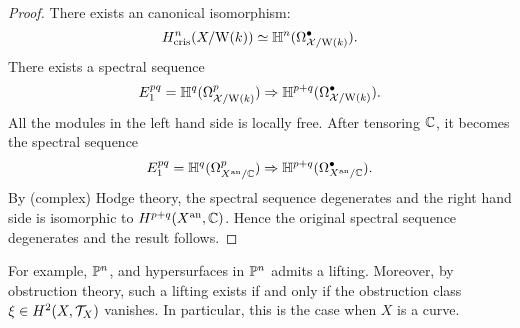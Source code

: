 \begin{proof}
    There exists an canonical isomorphism:
    \[ 
        H^n_{\mathrm{cris}}(X/\mathrm{W}(k)) \simeq {\mathbb {H}}^n (\Omega_{{\mathcal {X}}/\mathrm{W}(k)}^\bullet).
    \]
    There exists a spectral sequence 
    \[
        E_1^{pq} = {\mathbb {H}}^q(\Omega_{{\mathcal {X}}/\mathrm{W}(k)}^p) 
        \Rightarrow {\mathbb {H}}^{p+q} (\Omega_{{\mathcal {X}}/\mathrm{W}(k)}^\bullet).
    \]
    All the modules in the left hand side is locally free. 
    After tensoring ${\mathbb {C}}$, it becomes the spectral sequence
    \[
        E_1^{pq} = {\mathbb {H}}^q(\Omega_{X^{\mathrm{an}}/{\mathbb {C}}}^p) 
        \Rightarrow {\mathbb {H}}^{p+q} (\Omega_{X^{\mathrm{an}}/{\mathbb {C}}}^\bullet).
    \]
    By (complex) Hodge theory, the spectral sequence degenerates 
    and the right hand side is isomorphic to $H^{p+q} (X^{\mathrm{an}},{\mathbb {C}})$. 
    Hence the original spectral sequence degenerates and the result follows.
\end{proof}
For example, ${\mathbb {P}}^n$, and hypersurfaces in ${\mathbb {P}}^n$ admits a lifting. 
Moreover, by obstruction theory, such a lifting exists if and only if 
the obstruction class $\xi \in H^2(X, {\mathcal {T}}_X)$ vanishes. 
In particular, this is the case when $X$ is a curve. 

